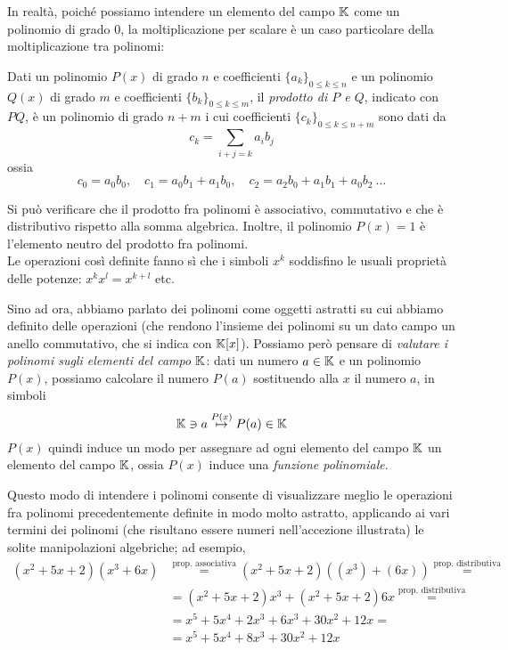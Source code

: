 In realtà, poiché possiamo intendere un elemento del campo $\amsbb{K}$ come un polinomio di grado $0$, la moltiplicazione per scalare è un caso particolare della moltiplicazione tra polinomi:
\begin{definition}
    \label{def:1.4}
    Dati un polinomio $P(x)$ di grado $n$ e coefficienti $\{a_k\}_{0\le k \le n}$ e un polinomio $Q(x)$ di grado $m$ e coefficienti $\{b_k\}_{0\le k \le m}$, il \emph{prodotto di $P$ e $Q$}, indicato con $PQ$, è un polinomio di grado $n+m$ i cui coefficienti $\{c_k\}_{0\le k \le n+m}$ sono dati da
    \[
    c_k = \sum_{i+j=k} a_ib_j
    \]
    ossia
    \[
    c_0 = a_0b_0, \quad c_1 = a_0b_1 + a_1b_0, \quad c_2 = a_2b_0 + a_1 b_1 + a_0b_2 \ \dots
    \]
\end{definition}
\begin{remark}
    Si può verificare che il prodotto fra polinomi è associativo, commutativo e che è distributivo rispetto alla somma algebrica. Inoltre, il polinomio $P(x) = 1$ è l'elemento neutro del prodotto fra polinomi.\\
    Le operazioni così definite fanno sì che i simboli $x^k$ soddisfino le usuali proprietà delle potenze: $x^kx^l = x^{k+l}$ etc.
\end{remark}
Sino ad ora, abbiamo parlato dei polinomi come oggetti astratti su cui abbiamo definito delle operazioni (che rendono l'insieme dei polinomi su un dato campo un anello commutativo, che si indica con $\amsbb{K}[x]$). Possiamo però pensare di \emph{valutare i polinomi sugli elementi del campo $\amsbb{K}$}: dati un numero $a\in\amsbb{K}$ e un polinomio $P(x)$, possiamo calcolare il numero $P(a)$ sostituendo alla $x$ il numero $a$, in simboli
\[
\amsbb{K}\ni a \overset{P(x)}{\mapsto} P(a)\in\amsbb{K}
\]
$P(x)$ quindi induce un modo per assegnare ad ogni elemento del campo $\amsbb{K}$ un elemento del campo $\amsbb{K}$, ossia $P(x)$ induce una \emph{funzione polinomiale}.
\begin{example}
    Questo modo di intendere i polinomi consente di visualizzare meglio le operazioni fra polinomi precedentemente definite in modo molto astratto, applicando ai vari termini dei polinomi (che risultano essere numeri nell'accezione illustrata) le solite manipolazioni algebriche; ad esempio,
    \[
    \begin{split}
    (x^2+5x+2)(x^3+6x) &\overset{\text{prop. associativa}}{=} (x^2+5x+2)\left((x^3)+(6x)\right)\overset{\text{prop. distributiva}}{=}\\
    & = (x^2+5x+2)x^3+(x^2 + 5x + 2)6x \overset{\text{prop. distributiva}}{=}\\
    & = x^5+5x^4+2x^3+6x^3+30x^2+12x = \\
    & = x^5+5x^4+8x^3+30x^2+12x
    \end{split}
    \]
\end{example}

